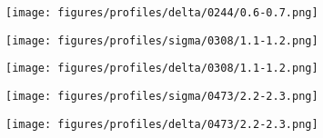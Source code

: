 \documentclass{beamer}
\begin{document}
  \begin{frame}
    \begin{figure}[H]
      \centering
      \texttt{[image: figures/profiles/delta/0244/0.6-0.7.png]}
    \end{figure}
  \end{frame}

  \begin{frame}
    \begin{figure}[H]
      \centering
      \texttt{[image: figures/profiles/sigma/0308/1.1-1.2.png]}
    \end{figure}
  \end{frame}

  \begin{frame}
    \begin{figure}[H]
      \centering
      \texttt{[image: figures/profiles/delta/0308/1.1-1.2.png]}
    \end{figure}
  \end{frame}

  \begin{frame}
    \begin{figure}[H]
      \centering
      \texttt{[image: figures/profiles/sigma/0473/2.2-2.3.png]}
    \end{figure}
  \end{frame}

  \begin{frame}
    \begin{figure}[H]
      \centering
      \texttt{[image: figures/profiles/delta/0473/2.2-2.3.png]}
    \end{figure}
  \end{frame}
\end{document}
